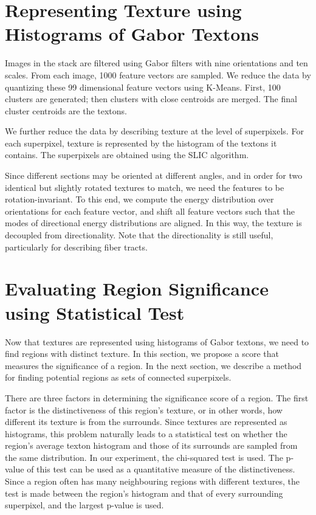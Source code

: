 \documentclass{llncs}
\begin{document}
\section{Representing Texture using Histograms of Gabor Textons} 

Images in the stack are filtered using Gabor filters with nine orientations and ten scales. From each image, 1000 feature vectors are sampled. We reduce the data by quantizing these 99 dimensional feature vectors using K-Means. First, 100 clusters are generated; then clusters with close centroids are merged. The final cluster centroids are the textons. 


We further reduce the data by describing texture at the level of superpixels. For each superpixel, texture is represented by the histogram of the textons it contains. The superpixels are obtained using the SLIC algorithm. 

Since different sections may be oriented at different angles, and in order for two identical but slightly rotated textures to match, we need the features to be rotation-invariant. To this end, we compute the energy distribution over orientations for each feature vector, and shift all feature vectors such that the modes of directional energy distributions are aligned. In this way, the texture is decoupled from directionality. Note that the directionality is still useful, particularly for describing fiber tracts.

\section{Evaluating Region Significance using Statistical Test}

Now that textures are represented using histograms of Gabor textons, we need to find regions with distinct texture. In this section, we propose a score that measures the significance of a region. In the next section, we describe a method for finding potential regions as sets of connected superpixels. 

There are three factors in determining the significance score of a region. The first factor is the distinctiveness of this region's texture, or in other words, how different its texture is from the surrounds. Since textures are represented as histograms, this problem naturally leads to a statistical test on whether the region's average texton histogram and those of its surrounds are sampled from the same distribution. In our experiment, the chi-squared test is used. The p-value of this test can be used as a quantitative measure of the distinctiveness. Since a region often has many neighbouring regions with different textures, the test is made between the region's histogram and that of every surrounding superpixel, and the largest p-value is used. 
\end{document}
